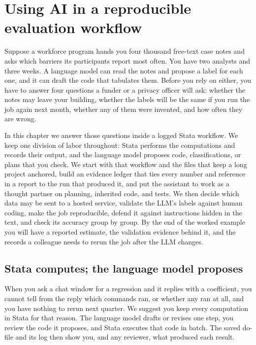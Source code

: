 \chapter{Using AI in a reproducible evaluation workflow}\label{ch:ai}

Suppose a workforce program hands you four thousand free-text case notes and asks which barriers its participants report most often. You have two analysts and three weeks. A language model can read the notes and propose a label for each one, and it can draft the code that tabulates them. Before you rely on either, you have to answer four questions a funder or a privacy officer will ask: whether the notes may leave your building, whether the labels will be the same if you run the job again next month, whether any of them were invented, and how often they are wrong.

In this chapter we answer those questions inside a logged Stata workflow. We keep one division of labor throughout: Stata performs the computations and records their output, and the language model proposes code, classifications, or plans that you check. We start with that workflow and the files that keep a long project anchored, build an evidence ledger that ties every number and reference in a report to the run that produced it, and put the assistant to work as a thought partner on planning, inherited code, and tests. We then decide which data may be sent to a hosted service, validate the LLM's labels against human coding, make the job reproducible, defend it against instructions hidden in the text, and check its accuracy group by group. By the end of the worked example you will have a reported estimate, the validation evidence behind it, and the records a colleague needs to rerun the job after the LLM changes.

\section{Stata computes; the language model proposes}\label{sec:backbone}
When you ask a chat window for a regression and it replies with a coefficient, you cannot tell from the reply which commands ran, or whether any ran at all, and you have nothing to rerun next quarter. We suggest you keep every computation in Stata for that reason. The language model drafts or revises one step, you review the code it proposes, and Stata executes that code in batch. The saved do-file and its log then show you, and any reviewer, what produced each result.

